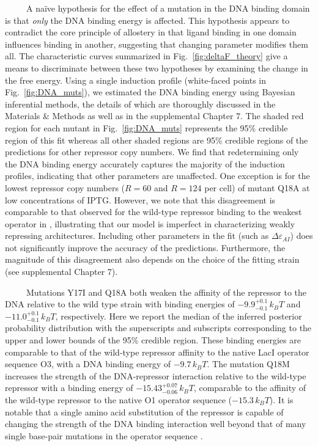 \documentclass[12pt]{caltech_thesis}
\begin{document}
~~~~~A naïve hypothesis for the effect of a mutation in the DNA binding
domain is that \emph{only} the DNA binding energy is affected. This
hypothesis appears to contradict the core principle of allostery in that
ligand binding in one domain influences binding in another, suggesting
that changing parameter modifies them all. The characteristic curves
summarized in Fig.~\ref{fig:deltaF_theory} give a means to discriminate
between these two hypotheses by examining the change in the free energy.
Using a single induction profile (white-faced points in
Fig.~\ref{fig:DNA_muts}), we estimated the DNA binding energy using
Bayesian inferential methods, the details of which are thoroughly
discussed in the Materials \& Methods as well as in the supplemental
Chapter 7. The shaded red region for each mutant in
Fig.~\ref{fig:DNA_muts} represents the 95\% credible region of this fit
whereas all other shaded regions are 95\% credible regions of the
predictions for other repressor copy numbers. We find that redetermining
only the DNA binding energy accurately captures the majority of the
induction profiles, indicating that other parameters are unaffected. One
exception is for the lowest repressor copy numbers (\(R = 60\) and
\(R=124\) per cell) of mutant Q18A at low concentrations of IPTG.
However, we note that this disagreement is comparable to that observed
for the wild-type repressor binding to the weakest operator in
\textcite{razo-mejia2018}, illustrating that our model is imperfect in
characterizing weakly repressing architectures. Including other
parameters in the fit (such as \(\Delta\varepsilon_{AI}\)) does not
significantly improve the accuracy of the predictions. Furthermore, the
magnitude of this disagreement also depends on the choice of the fitting
strain (see supplemental Chapter 7).

~~~~~Mutations Y17I and Q18A both weaken the affinity of the repressor
to the DNA relative to the wild type strain with binding energies of
\(-9.9 ^{+0.1}_{-0.1}\, k_BT\) and \(-11.0^{+0.1}_{-0.1}\, k_BT\),
respectively. Here we report the median of the inferred posterior
probability distribution with the superscripts and subscripts
corresponding to the upper and lower bounds of the 95\% credible region.
These binding energies are comparable to that of the wild-type repressor
affinity to the native LacI operator sequence O3, with a DNA binding
energy of \(-9.7\, k_BT\). The mutation Q18M increases the strength of
the DNA-repressor interaction relative to the wild-type repressor with a
binding energy of \(-15.43^{+0.07}_{-0.06}\, k_BT\), comparable to the
affinity of the wild-type repressor to the native O1 operator sequence
(\(-15.3\, k_BT\)). It is notable that a single amino acid substitution
of the repressor is capable of changing the strength of the DNA binding
interaction well beyond that of many single base-pair mutations in the
operator sequence \autocite{barnes2019}.
\end{document}
